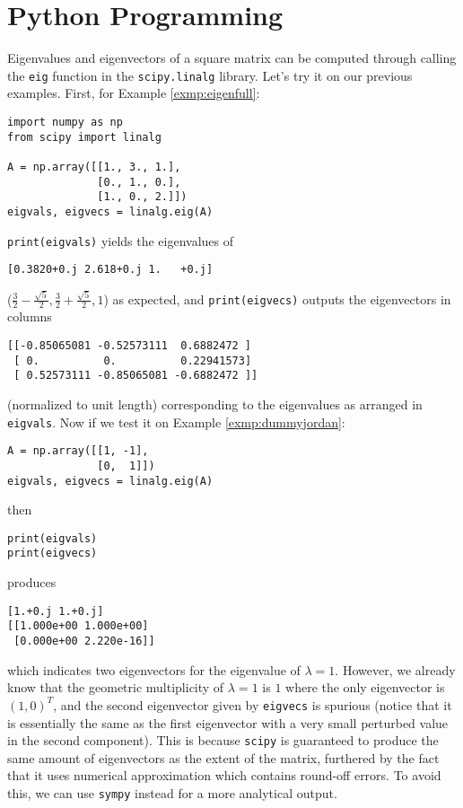 \section{Python Programming}
Eigenvalues and eigenvectors of a square matrix can be computed through calling the \verb|eig| function in the \texttt{scipy.linalg} library. Let's try it on our previous examples. First, for Example \ref{exmp:eigenfull}:
\begin{lstlisting}
import numpy as np
from scipy import linalg

A = np.array([[1., 3., 1.],
              [0., 1., 0.],
              [1., 0., 2.]])
eigvals, eigvecs = linalg.eig(A)
\end{lstlisting}
\verb|print(eigvals)| yields the eigenvalues of 
\begin{lstlisting}
[0.3820+0.j 2.618+0.j 1.   +0.j]    
\end{lstlisting}
($\frac{3}{2}-\frac{\sqrt{5}}{2}, \frac{3}{2}+\frac{\sqrt{5}}{2}, 1$) as expected, and \verb|print(eigvecs)| outputs the eigenvectors in columns
\begin{lstlisting}
[[-0.85065081 -0.52573111  0.6882472 ]
 [ 0.          0.          0.22941573]
 [ 0.52573111 -0.85065081 -0.6882472 ]]
\end{lstlisting}
(normalized to unit length) corresponding to the eigenvalues as arranged in \verb|eigvals|. Now if we test it on Example \ref{exmp:dummyjordan}:
\begin{lstlisting}
A = np.array([[1, -1],
              [0,  1]])
eigvals, eigvecs = linalg.eig(A)
\end{lstlisting}
then
\begin{lstlisting}
print(eigvals)
print(eigvecs)
\end{lstlisting}
produces
\begin{lstlisting}
[1.+0.j 1.+0.j]
[[1.000e+00 1.000e+00]
 [0.000e+00 2.220e-16]]
\end{lstlisting}
which indicates two eigenvectors for the eigenvalue of $\lambda = 1$. However, we already know that the geometric multiplicity of $\lambda = 1$ is $1$ where the only eigenvector is $(1,0)^T$, and the second eigenvector given by \verb|eigvecs| is spurious (notice that it is essentially the same as the first eigenvector with a very small perturbed value in the second component). This is because \texttt{scipy} is guaranteed to produce the same amount of eigenvectors as the extent of the matrix, furthered by the fact that it uses numerical approximation which contains round-off errors. To avoid this, we can use \texttt{sympy} instead for a more analytical output.
